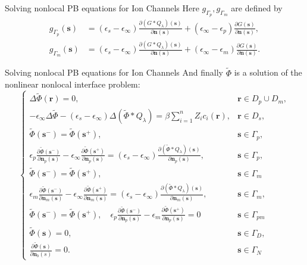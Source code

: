 \documentclass{beamer}
\newcommand{\Phit}{\tilde{\Phi}}
\newcommand{\rr}{{\mathbf r}}
\newcommand{\s}{{\mathbf s}}
\newcommand{\nn}{{\mathbf n}}
\begin{document}
\begin{frame}{Solving nonlocal PB equations for Ion Channels}
    Here  $g_{\Gamma_p}, g_{\Gamma_m}$ are defined by
\begin{align}
\label{g-def}
g_{\Gamma_p}(\s) &=  (\epsilon_s-\epsilon_\infty)\frac{\partial (G\ast Q_{\lambda})(\s)}{\partial \nn(\s)} + (\epsilon_\infty-\epsilon_p)\frac{\partial G(\s)}{\partial \nn(\s)}, \\
g_{\Gamma_m}(\s) &=  (\epsilon_s-\epsilon_\infty)\frac{\partial (G\ast Q_{\lambda})(\s)}{\partial \nn(\s)} + (\epsilon_\infty-\epsilon_m)\frac{\partial G(\s)}{\partial \nn(\s)}.
\end{align}
\end{frame}
\begin{frame}{Solving nonlocal PB equations for Ion Channels}
    And finally $ \Phit$ is a solution of the nonlinear nonlocal interface problem:
    \begin{equation}\label{eq:phit}
    \left\{
    \begin{array}{cl}
    \Delta \Phit (\rr) = 0, & \rr\in D_p \cup D_m,\\
    -\epsilon_\infty\Delta \Phit  - (\epsilon_s-\epsilon_\infty)\Delta(\Phit \ast Q_{\lambda}) =
    \beta \sum\limits_{i=1}^{n}Z_{i}c_i(\rr), & \rr \in D_s,\\
     \Phit (\s^{-}) = \Phit (\s^{+}), &\s\in\Gamma_p,\\
    \epsilon_p\frac{\partial \Phit (\s^{-})}{\partial \nn_p(\s)} - \epsilon_{\infty}\frac{\partial \Phit (\s^{+})}{\partial \nn_p(\s)} = (\epsilon_s-\epsilon_\infty)\frac{\partial ( \Phit  \ast Q_{\lambda})(\s)}{\partial \nn_p(\s)}, & \s\in\Gamma_p,\\
     \Phit (\s^{-}) = \Phit (\s^{+}), & \s\in\Gamma_m\\
    \epsilon_m\frac{\partial \Phit (\s^{-})}{\partial \nn_m(\s)} - \epsilon_{\infty}\frac{\partial \Phit (\s^{+})}{\partial \nn_m(\s)} = (\epsilon_s-\epsilon_\infty)\frac{\partial ( \Phit  \ast Q_{\lambda})(\s)}{\partial \nn_m(\s)}, & \s\in\Gamma_m,\\
    \Phit (\s^{-}) = \Phit (\s^{+}), \quad
    \epsilon_p\frac{\partial \Phit (\s^{-})}{\partial \nn_p(\s)} - \epsilon_{m}\frac{\partial \Phit (\s^{+})}{\partial \nn_p(\s)} = 0 & \s \in \Gamma_{pm} \\
    \Phit (\s) = 0, & \s \in \Gamma_D, \\
    \frac{\partial \Phit(\s)}{\partial \nn_b(s)} = 0. & \s \in \Gamma_N
    \end{array}
    \right.
    \end{equation}
\end{frame}
\end{document}
